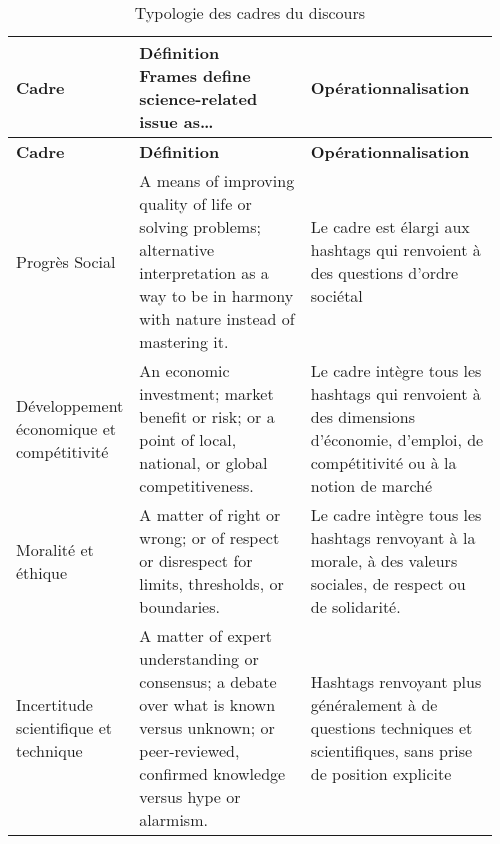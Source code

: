         \begin{landscape}
            \begin{spacing}{1}
            \begin{small}
            \begin{longtable}{
            |K{0.18\linewidth}
            |K{0.38\linewidth}
            |K{0.40\linewidth}
            |}
            \caption{Typologie des cadres du discours}
            \label{table:6} \\
                \hline
                \textbf{Cadre} & \textbf{Définition \parencite{nisbet2009communicating} \newline Frames define science-related issue as…} & \textbf{Opérationnalisation}\\ \hline
                \endfirsthead
                \hline
                \textbf{Cadre} & \textbf{Définition \parencite{nisbet2009communicating}} & \textbf{Opérationnalisation}\\ \hline
                \endhead
                \hline
            Progrès Social
            &A means of improving quality of life or solving problems; alternative interpretation as a way to be in harmony with nature instead of mastering it.
            &Le cadre est élargi aux hashtags qui renvoient à des questions d’ordre sociétal
            \\ \hline

            Développement économique et compétitivité
            &An economic investment; market benefit or risk; or a point of local, national, or global competitiveness.
            &Le cadre intègre tous les hashtags qui renvoient à des dimensions d’économie, d’emploi, de compétitivité ou à la notion de marché
            \\ \hline

            Moralité et éthique
            &A matter of right or wrong; or of respect or disrespect for limits, thresholds, or boundaries.
            &Le cadre intègre tous les hashtags renvoyant à la morale, à des valeurs sociales, de respect ou de solidarité.
            \\ \hline

            Incertitude scientifique et technique
            &A matter of expert understanding or consensus; a debate over what is known versus unknown; or peer-reviewed, confirmed knowledge versus hype or alarmism.
            &Hashtags renvoyant plus généralement à de questions techniques et scientifiques, sans prise de position explicite
            \\ \hline


\end{longtable}
\end{small}
\end{spacing}
\end{landscape}
